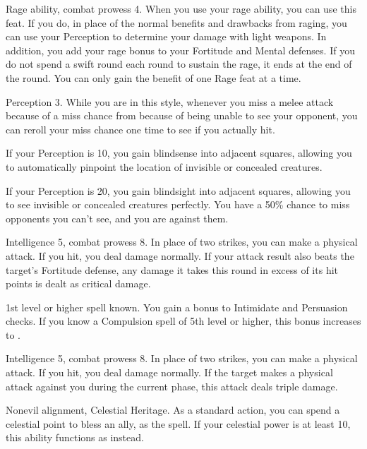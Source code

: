 \featpres Rage ability, combat prowess 4.
\featben When you use your rage ability, you can use this feat. If you do, in place of the normal benefits and drawbacks from raging, you can use your Perception to determine your damage with light weapons.
In addition, you add your rage bonus to your Fortitude and Mental defenses.
If you do not spend a swift round each round to sustain the rage, it ends at the end of the round.
 You can only gain the benefit of one Rage feat at a time.

\featpre Perception 3.
\featben While you are in this style, whenever you miss a melee attack because of a miss chance from because of being unable to see your opponent, you can reroll your miss chance one time to see if you actually hit.
\par If your Perception is 10, you gain blindsense into adjacent squares, allowing you to automatically pinpoint the location of invisible or concealed creatures.
\par If your Perception is 20, you gain blindsight into adjacent squares, allowing you to see invisible or concealed creatures perfectly.
You have a 50\% chance to miss opponents you can't see, and you are  against them.

\featpres Intelligence 5, combat prowess 8.
\featben In place of two strikes, you can make a physical attack.
If you hit, you deal damage normally.
If your attack result also beats the target's Fortitude defense, any damage it takes this round in excess of its hit points is dealt as critical damage.

\featpre 1st level or higher  spell known.
\featben You gain a  bonus to Intimidate and Persuasion checks.
If you know a Compulsion spell of 5th level or higher, this bonus increases to .

\featpres Intelligence 5, combat prowess 8.
\featben In place of two strikes, you can make a physical attack.
If you hit, you deal damage normally.
If the target makes a physical attack against you during the current phase, this attack deals triple damage.

\featpres Nonevil alignment, Celestial Heritage.
\featben As a standard action, you can spend a celestial point to bless an ally, as the  spell.
If your celestial power is at least 10, this ability functions as  instead.

